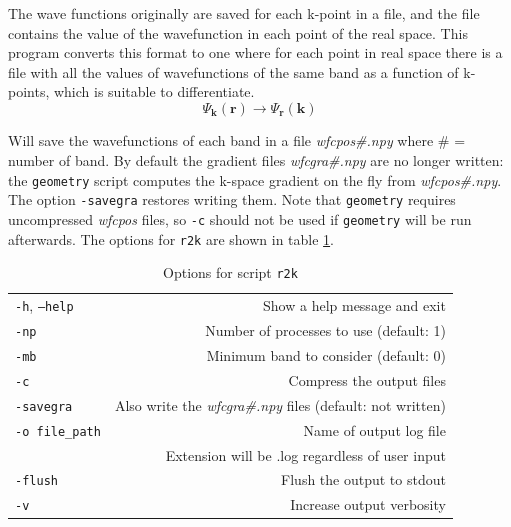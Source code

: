 \documentclass[a4paper,12pt]{report}
\begin{document}
The wave functions originally are saved for each k-point in a file, and the file contains the value of the wavefunction in each
point of the real space.
This program converts this format to one where for each point in real space there is a file with all the values of wavefunctions
of the same band as a function of k-points, which is suitable to differentiate.
\begin{equation*}
 \Psi_{\pmb{k}}(\pmb{r}) \rightarrow \Psi_{\pmb{r}}(\pmb{k})
\end{equation*}

Will save the wavefunctions of each band in a file \emph{wfcpos\#.npy} where \# = number of band.
By default the gradient files \emph{wfcgra\#.npy} are no longer written: the \texttt{geometry}
script computes the k-space gradient on the fly from \emph{wfcpos\#.npy}.
The option \texttt{-savegra} restores writing them.
Note that \texttt{geometry} requires uncompressed \emph{wfcpos} files, so \texttt{-c} should
not be used if \texttt{geometry} will be run afterwards.
The options for \texttt{r2k} are shown in table \ref{tab:options_r2k}.

\begin{table}[ht]
 \centering
 \caption{Options for script \texttt{r2k}}\label{tab:options_r2k}
\begin{tabular}[]{lr}
\hline
  \texttt{-h}, \texttt{--help}  &\hspace*{2cm} Show a help message and exit \\
  \texttt{-np}                  & Number of processes to use (default: 1) \\
  \texttt{-mb}                  & Minimum band to consider (default: 0) \\
  \texttt{-c}                   & Compress the output files \\
  \texttt{-savegra}             & Also write the \emph{wfcgra\#.npy} files (default: not written) \\
  \texttt{-o file\_path}        & Name of output log file\\
                                & Extension will be .log regardless of user input\\
  \texttt{-flush}               & Flush the output to stdout \\
  \texttt{-v}                   & Increase output verbosity \\
  \hline
\end{tabular}
\end{table}
\end{document}
